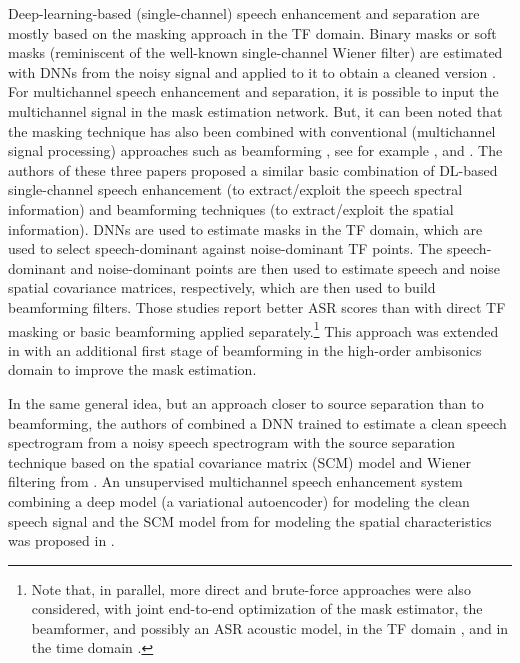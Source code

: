 Deep-learning-based (single-channel) speech enhancement and separation are mostly based on the masking approach in the TF domain. Binary masks or soft masks (reminiscent of the well-known single-channel Wiener filter) are estimated with DNNs from the noisy signal and applied to it to obtain a cleaned version \cite{wang2017supervised}.
For multichannel speech enhancement and separation, it is possible to input the multichannel signal in the mask estimation network. But, it can been noted that the masking technique has also been combined with conventional (multichannel signal processing) approaches such as beamforming \cite{van1988beamforming}, see for example \cite{erdogan2016improved}, \cite{heymann2016neural} and \cite{higuchi2017deep}. The authors of these three papers proposed a similar basic combination of DL-based single-channel speech enhancement (to extract/exploit the speech spectral information) and beamforming techniques (to extract/exploit the spatial information). DNNs are used to estimate masks in the TF domain, which are used to select speech-dominant against noise-dominant TF points. The speech-dominant and noise-dominant points are then used to estimate speech and noise spatial covariance matrices, respectively, which are then used to build beamforming filters. Those studies report better ASR scores than with direct TF masking or basic beamforming applied separately.\footnote{Note that, in parallel, more direct and brute-force approaches were also considered, with joint end-to-end optimization of the mask estimator, the beamformer, and possibly an ASR acoustic model, in the TF domain \cite{meng2017deep, heymann2017beamnet}, and in the time domain \cite{li2016neural}.}
This approach was extended in \cite{perotin2018multichannel} with an additional first stage of beamforming in the high-order ambisonics domain to improve the mask estimation. 

In the same general idea, but an approach closer to source separation than to beamforming, the authors of 
\cite{nugraha2016multichannel} combined a DNN trained to estimate a clean speech spectrogram from a noisy speech spectrogram with the source separation technique based on the spatial covariance matrix (SCM) model and Wiener filtering from \cite{duong2010un}. An unsupervised multichannel speech enhancement system combining a deep model (a variational autoencoder) for modeling the clean speech signal and the SCM model from \cite{duong2010un} for modeling the spatial characteristics was proposed in \cite{leglaive2019semi}. 

